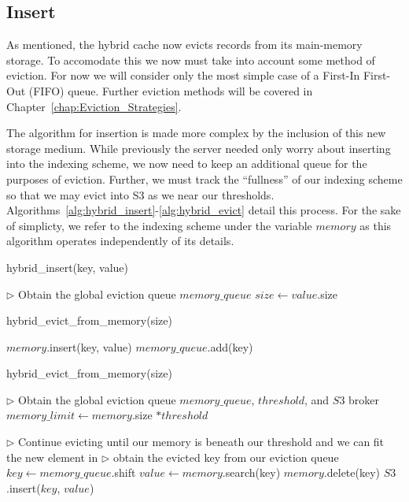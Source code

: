 
\subsection{Insert} %
\label{sub:hybrid_insert}
As mentioned, the hybrid cache now evicts records from its main-memory storage.
To accomodate this we now must take into account some method of eviction. For
now we will consider only the most simple case of a First-In First-Out (FIFO)
queue. Further eviction methods will be covered in
Chapter~\ref{chap:Eviction_Strategies}.

The algorithm for insertion is made more complex by the inclusion of this new
storage medium. While previously the server needed only worry about inserting
into the indexing scheme, we now need to keep an additional queue for the
purposes of eviction. Further, we must track the ``fullness'' of our indexing
scheme so that we may evict into S3 as we near our thresholds.
Algorithms~\ref{alg:hybrid_insert}-\ref{alg:hybrid_evict} detail this process.
For the sake of simplicty, we refer to the indexing scheme under the variable
$memory$ as this algorithm operates independently of its details.

\begin{algorithm}[htp]
\small
\caption{\label{alg:hybrid_insert}hybrid\_insert(key, value)}
\begin{algorithmic}[1]
\STATE $\triangleright$ Obtain the global eviction queue $memory\_queue$
\STATE $size \leftarrow value$.size

  \STATE hybrid\_evict\_from\_memory(size)
\ENDIF

\STATE $memory$.insert(key, value)
\STATE $memory\_queue$.add(key)
\end{algorithmic}
\end{algorithm}

\begin{algorithm}[htp]
\small
\caption{\label{alg:hybrid_evict}hybrid\_evict\_from\_memory(size)}
\begin{algorithmic}[1]
\STATE $\triangleright$ Obtain the global eviction queue $memory\_queue$,
$threshold$, and $S3$ broker
\STATE $memory\_limit \leftarrow memory$.size $* threshold$

\STATE $\triangleright$ Continue evicting until our memory is beneath our
threshold and we can fit the new element in
  \STATE $\triangleright$ obtain the evicted key from our eviction queue
  \STATE $key \leftarrow memory\_queue$.shift
  \STATE $value \leftarrow memory$.search(key)
  \STATE $memory$.delete(key)
  \STATE $S3$.insert($key$, $value$)
\ENDWHILE
\end{algorithmic}
\end{algorithm}

